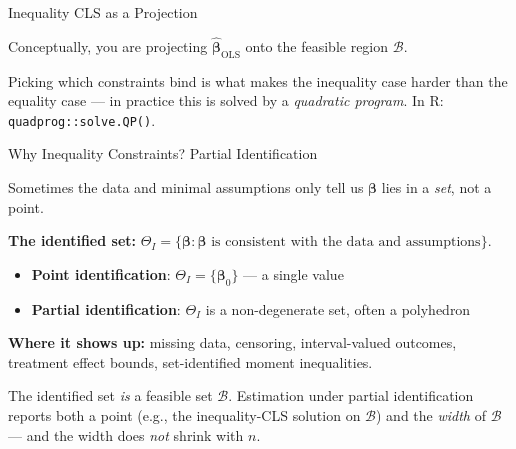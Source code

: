 \documentclass[handout, aspectratio=169]{beamer}
\numberwithin{equation}{section}
\begin{document}
\begin{frame}{Inequality CLS as a Projection}

Conceptually, you are projecting $\hat{\bm{\beta}}_{\text{OLS}}$ onto the feasible region $\mathcal{B}$.

\pause
\bigskip

Picking which constraints bind is what makes the inequality case harder than the equality case --- in practice this is solved by a \emph{quadratic program}.  In R: \texttt{quadprog::solve.QP()}.

\end{frame}

\begin{frame}{Why Inequality Constraints? Partial Identification}

Sometimes the data and minimal assumptions only tell us $\bm{\beta}$ lies in a \emph{set}, not a point.

\pause
\smallskip

\textbf{The identified set:} $\Theta_I = \{\bm{\beta} : \bm{\beta} \text{ is consistent with the data and assumptions}\}$.
\begin{itemize}
\item \textbf{Point identification}: $\Theta_I = \{\bm{\beta}_0\}$ — a single value
\item \textbf{Partial identification}: $\Theta_I$ is a non-degenerate set, often a polyhedron
\end{itemize}

\pause
\smallskip

\textbf{Where it shows up:} missing data, censoring, interval-valued outcomes, treatment effect bounds, set-identified moment inequalities.

\pause
\smallskip

\begin{tcolorbox}[colback=blue!5, colframe=blue!50]
The identified set \emph{is} a feasible set $\mathcal{B}$.  Estimation under partial identification reports both a point (e.g., the inequality-CLS solution on $\mathcal{B}$) and the \emph{width} of $\mathcal{B}$ — and the width does \emph{not} shrink with $n$.
\end{tcolorbox}
\end{frame}
\end{document}
